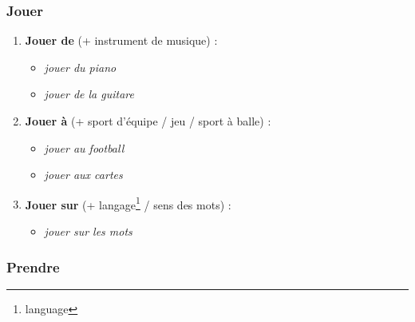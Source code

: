 \documentclass[math,code]{amznotes}
\theoremstyle{remark}
\begin{document}
\subsubsection*{Jouer}
\begin{enumerate}
    \item \textbf{Jouer de} (+ instrument de musique) :
    \begin{itemize}
        \item \textit{jouer du piano}
        \item \textit{jouer de la guitare}
    \end{itemize}
    \item \textbf{Jouer à} (+ sport d'équipe / jeu / sport à balle) :
    \begin{itemize}
        \item \textit{jouer au football}
        \item \textit{jouer aux cartes}
    \end{itemize}
    \item \textbf{Jouer sur} (+ langage\footnote{language} / sens des mots) :
    \begin{itemize}
        \item \textit{jouer sur les mots}
    \end{itemize}
\end{enumerate}

\subsubsection*{Prendre}
\end{document}
